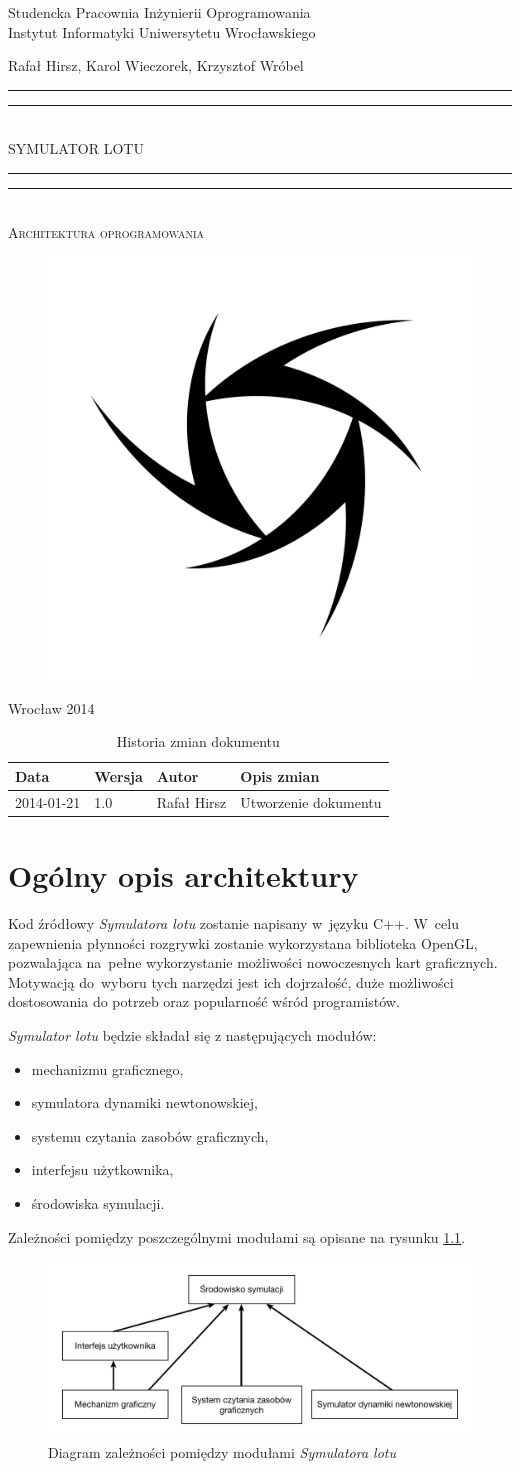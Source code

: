 \documentclass{mwrep}
\newcommand*{\titleGP}{\begingroup
\centering

{\large Studencka Pracownia Inżynierii Oprogramowania}\\Instytut Informatyki Uniwersytetu Wrocławskiego\par
\vspace*{16\baselineskip}

{\Large Rafał Hirsz, Karol Wieczorek, Krzysztof Wróbel\par}
\vspace*{\baselineskip}

\rule{\textwidth}{1.6pt}\vspace*{-\baselineskip}\vspace*{2pt}
\rule{\textwidth}{0.4pt}\\[\baselineskip]

{\Huge SYMULATOR LOTU}\\[0.2\baselineskip]

\rule{\textwidth}{0.4pt}\vspace*{-\baselineskip}\vspace{3.2pt}
\rule{\textwidth}{1.6pt}\\[\baselineskip]

\scshape
{\huge Architektura oprogramowania}\par
\vspace*{2\baselineskip}

\begin{figure}[h]
\centering
\includegraphics[width=5\baselineskip]{flightsim-team-logo.pdf}
\end{figure}
\vfill

{\large Wrocław 2014}\par

\pagebreak

\endgroup}
\begin{document}
\thispagestyle{empty}
\titleGP

\begin{center}
\begin{table}[h]
\begin{center}
\caption{Historia zmian dokumentu}\label{T:Zmiany}
\vspace{3ex}
\begin{tabularx}{1\textwidth}{|l|l|l|X|}
\hline
Data & Wersja & Autor & Opis zmian \\ \hline
2014-01-21 & 1.0 & Rafał Hirsz & Utworzenie dokumentu \\
\hline
\end{tabularx}
\end{center}
\end{table}
\end{center}

\pagebreak

\tableofcontents

\chapter{Ogólny opis architektury}

Kod źródłowy \textit{Symulatora lotu} zostanie napisany w~języku C++. W~celu zapewnienia płynności rozgrywki zostanie wykorzystana biblioteka OpenGL, pozwalająca na~pełne wykorzystanie możliwości nowoczesnych kart graficznych. Motywacją do~wyboru tych narzędzi jest ich dojrzałość, duże możliwości dostosowania do potrzeb oraz popularność wśród programistów.

\vspace{1em}
\textit{Symulator lotu} będzie składał się z następujących modułów:
\begin{itemize}
    \item mechanizmu graficznego,
    \item symulatora dynamiki newtonowskiej,
    \item systemu czytania zasobów graficznych,
    \item interfejsu użytkownika,
    \item środowiska symulacji.
\end{itemize}

\vspace{1em}
Zależności pomiędzy poszczególnymi modułami są opisane na rysunku \ref{F:zaleznosci}.

\begin{figure}[h]
\centering
\caption{Diagram zależności pomiędzy modułami \textit{Symulatora lotu} \label{F:zaleznosci}}
\includegraphics[width=\textwidth]{diagram-zaleznosci-ai.pdf}
\end{figure}
\end{document}
